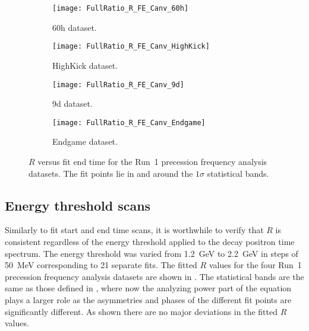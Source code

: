 \begin{figure}
\centering
    \begin{subfigure}[]{0.45\textwidth}
        \centering
        \texttt{[image: FullRatio\_R\_FE\_Canv\_60h]}
        \caption{60h dataset.}
    \end{subfigure}%
    \begin{subfigure}[]{0.45\textwidth}
        \centering
        \texttt{[image: FullRatio\_R\_FE\_Canv\_HighKick]}
        \caption{HighKick dataset.}
    \end{subfigure}

    \begin{subfigure}[]{0.45\textwidth}
        \centering
        \texttt{[image: FullRatio\_R\_FE\_Canv\_9d]}
        \caption{9d dataset.}
    \end{subfigure}%
    \begin{subfigure}[]{0.45\textwidth}
        \centering
        \texttt{[image: FullRatio\_R\_FE\_Canv\_Endgame]}
        \caption{Endgame dataset.}
    \end{subfigure}
\caption[$R$ versus fit end time]{$R$ versus fit end time for the Run~1 precession frequency analysis datasets. The fit points lie in and around the $1\sigma$ statistical bands.}
\label{fig:fitEndTime_R}
\end{figure}

\clearpage 

\subsection{Energy threshold scans}


Similarly to fit start and end time scans, it is worthwhile to verify that $R$ is consistent regardless of the energy threshold applied to the decay positron time spectrum. The energy threshold was varied from \SI{1.2}{\GeV} to \SI{2.2}{\GeV} in steps of \SI{50}{\MeV} corresponding to 21 separate fits. The fitted $R$ values for the four Run~1 precession frequency analysis datasets are shown in . The statistical bands are the same as those defined in , where now the analyzing power part of the equation plays a larger role as the asymmetries and phases of the different fit points are significantly different. As shown there are no major deviations in the fitted $R$ values.


